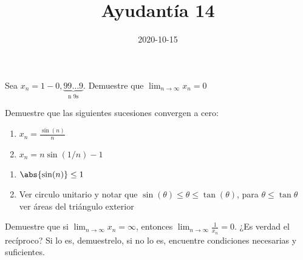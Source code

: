 \documentclass{ayudantia}
\title{Ayudantía 14}
\date{2020-10-15}
\begin{document}
\maketitle


\begin{prob}
    Sea \(x_n=1-0,\underbrace{99\ldots9}_{\text{n 9s}}\). Demuestre que \(\lim_{n\rightarrow\infty}x_n=0\)
\end{prob}

\begin{ans}
    \begin{sol}

\end{sol}
\end{ans}



\begin{prob}
    Demuestre que las siguientes sucesiones convergen a cero:
    \begin{enumerate}
        \item \(x_n=\frac{\sin(n)}n\)
        \item \(x_n=n\sin(1/n)-1\)
    \end{enumerate}
\end{prob}

\begin{ans}
    \begin{sol}
        \begin{enumerate}
            \item \(\abs{\sin(n)}\leq1\)
            \item Ver circulo unitario y notar que \(\sin(\theta)\leq\theta\leq\tan(\theta)\), para \(\theta\leq\tan\theta\) ver áreas del triángulo exterior
        \end{enumerate}
\end{sol}
\end{ans}



\begin{prob}
    Demuestre que si \(\lim_{n\rightarrow\infty}x_n=\infty\), entonces \(\lim_{n\rightarrow\infty}\frac1{x_n}=0\). ¿Es verdad el recíproco? Si lo es, demuestrelo, si no lo es, encuentre condiciones necesarias y suficientes.
\end{prob}

\begin{ans}
    \begin{sol}

    \end{sol}
\end{ans}
\end{document}
